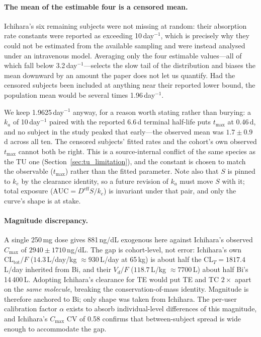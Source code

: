\documentclass[11pt,a4paper]{article}
\begin{document}
\paragraph{The mean of the estimable four is a censored mean.} Ichihara's
six remaining subjects were not missing at random: their absorption rate
constants were reported as exceeding 10\,day$^{-1}$, which is precisely why
they could not be estimated from the available sampling and were instead
analysed under an intravenous model. Averaging only the four estimable
values---all of which fall below 3.2\,day$^{-1}$---selects the slow tail of
the distribution and biases the mean downward by an amount the paper does
not let us quantify. Had the censored subjects been included at anything
near their reported lower bound, the population mean would be several times
1.96\,day$^{-1}$.

We keep 1.9625\,day$^{-1}$ anyway, for a reason worth stating rather than
burying: a $k_a$ of 10\,day$^{-1}$ paired with the reported 6.6\,d terminal
half-life puts $t_{\max}$ at 0.46\,d, and no subject in the study peaked
that early---the observed mean was $1.7 \pm 0.9$\,d across all ten. The
censored subjects' fitted rates and the cohort's own observed $t_{\max}$
cannot both be right. This is a source-internal conflict of the same species
as the TU one (Section~\ref{sec:tu_limitation}), and the constant is chosen
to match the observable ($t_{\max}$) rather than the fitted parameter. Note
also that $S$ is pinned to $k_e$ by the clearance identity, so a future
revision of $k_a$ must move $S$ with it; total exposure
($\mathrm{AUC} = D^{\text{eff}} S / k_e$) is invariant under that pair, and
only the curve's shape is at stake.

\paragraph{Magnitude discrepancy.} A single 250\,mg dose gives 881\,ng/dL
exogenous here against Ichihara's observed $C_{\max}$ of $2940 \pm
1710$\,ng/dL. The gap is cohort-level, not error: Ichihara's own
$\mathrm{CL}_{\text{tot}}/F$ ($14.3$\,L/day/kg $\approx 930$\,L/day at
65\,kg) is about half the $\mathrm{CL}_T = 1817.4$\,L/day inherited from
Bi, and their $V_d/F$ ($118.7$\,L/kg $\approx 7700$\,L) about half Bi's
14\,400\,L. Adopting Ichihara's clearance for TE would put TE and TC
$2\times$ apart on the \emph{same molecule}, breaking the
conservation-of-mass identity. Magnitude is therefore anchored to Bi;
only shape was taken from Ichihara. The per-user calibration factor
$\alpha$ exists to absorb individual-level differences of this
magnitude, and Ichihara's $C_{\max}$ CV of 0.58 confirms that
between-subject spread is wide enough to accommodate the gap.
\end{document}
